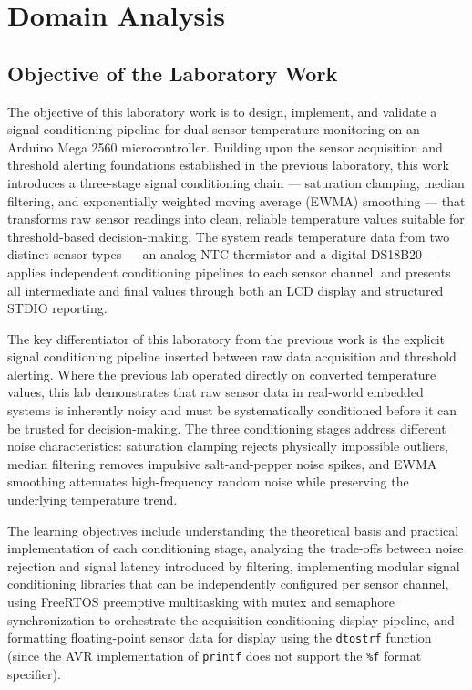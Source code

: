 \section{Domain Analysis}

\subsection{Objective of the Laboratory Work}

The objective of this laboratory work is to design, implement, and validate a signal conditioning pipeline for dual-sensor temperature monitoring on an Arduino Mega 2560 microcontroller. Building upon the sensor acquisition and threshold alerting foundations established in the previous laboratory, this work introduces a three-stage signal conditioning chain --- saturation clamping, median filtering, and exponentially weighted moving average (EWMA) smoothing --- that transforms raw sensor readings into clean, reliable temperature values suitable for threshold-based decision-making. The system reads temperature data from two distinct sensor types --- an analog NTC thermistor and a digital DS18B20 --- applies independent conditioning pipelines to each sensor channel, and presents all intermediate and final values through both an LCD display and structured STDIO reporting.

The key differentiator of this laboratory from the previous work is the explicit signal conditioning pipeline inserted between raw data acquisition and threshold alerting. Where the previous lab operated directly on converted temperature values, this lab demonstrates that raw sensor data in real-world embedded systems is inherently noisy and must be systematically conditioned before it can be trusted for decision-making. The three conditioning stages address different noise characteristics: saturation clamping rejects physically impossible outliers, median filtering removes impulsive salt-and-pepper noise spikes, and EWMA smoothing attenuates high-frequency random noise while preserving the underlying temperature trend.

The learning objectives include understanding the theoretical basis and practical implementation of each conditioning stage, analyzing the trade-offs between noise rejection and signal latency introduced by filtering, implementing modular signal conditioning libraries that can be independently configured per sensor channel, using FreeRTOS preemptive multitasking with mutex and semaphore synchronization to orchestrate the acquisition-conditioning-display pipeline, and formatting floating-point sensor data for display using the \texttt{dtostrf} function (since the AVR implementation of \texttt{printf} does not support the \texttt{\%f} format specifier).

